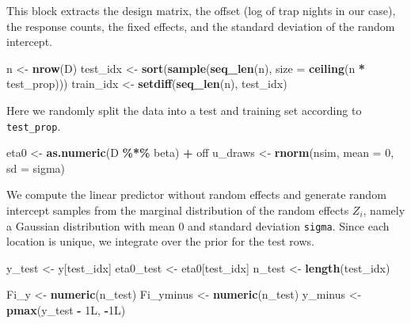 \documentclass[
  letterpaper,
]{krantz}
\newenvironment{Shaded}{\begin{snugshade}}{\end{snugshade}}
\newcommand{\AttributeTok}[1]{\textcolor[rgb]{0.13,0.29,0.53}{#1}}
\newcommand{\DecValTok}[1]{\textcolor[rgb]{0.00,0.00,0.81}{#1}}
\newcommand{\FunctionTok}[1]{\textcolor[rgb]{0.13,0.29,0.53}{\textbf{#1}}}
\newcommand{\NormalTok}[1]{#1}
\newcommand{\OtherTok}[1]{\textcolor[rgb]{0.56,0.35,0.01}{#1}}
\newcommand{\SpecialCharTok}[1]{\textcolor[rgb]{0.81,0.36,0.00}{\textbf{#1}}}
\begin{document}
This block extracts the design matrix, the offset (log of trap nights in
our case), the response counts, the fixed effects, and the standard
deviation of the random intercept.

\begin{Shaded}
\begin{Highlighting}[]
\NormalTok{  n }\OtherTok{\textless{}{-}} \FunctionTok{nrow}\NormalTok{(D)}
\NormalTok{  test\_idx  }\OtherTok{\textless{}{-}} \FunctionTok{sort}\NormalTok{(}\FunctionTok{sample}\NormalTok{(}\FunctionTok{seq\_len}\NormalTok{(n), }\AttributeTok{size =} \FunctionTok{ceiling}\NormalTok{(n }\SpecialCharTok{*}\NormalTok{ test\_prop)))}
\NormalTok{  train\_idx }\OtherTok{\textless{}{-}} \FunctionTok{setdiff}\NormalTok{(}\FunctionTok{seq\_len}\NormalTok{(n), test\_idx)}
\end{Highlighting}
\end{Shaded}

Here we randomly split the data into a test and training set according
to \texttt{test\_prop}.

\begin{Shaded}
\begin{Highlighting}[]
\NormalTok{  eta0 }\OtherTok{\textless{}{-}} \FunctionTok{as.numeric}\NormalTok{(D }\SpecialCharTok{\%*\%}\NormalTok{ beta) }\SpecialCharTok{+}\NormalTok{ off}
\NormalTok{  u\_draws }\OtherTok{\textless{}{-}} \FunctionTok{rnorm}\NormalTok{(nsim, }\AttributeTok{mean =} \DecValTok{0}\NormalTok{, }\AttributeTok{sd =}\NormalTok{ sigma)}
\end{Highlighting}
\end{Shaded}

We compute the linear predictor without random effects and generate
random intercept samples from the marginal distribution of the random
effects \(Z_i\), namely a Gaussian distribution with mean 0 and standard
deviation \texttt{sigma}. Since each location is unique, we integrate
over the prior for the test rows.

\begin{Shaded}
\begin{Highlighting}[]
\NormalTok{  y\_test    }\OtherTok{\textless{}{-}}\NormalTok{ y[test\_idx]}
\NormalTok{  eta0\_test }\OtherTok{\textless{}{-}}\NormalTok{ eta0[test\_idx]}
\NormalTok{  n\_test    }\OtherTok{\textless{}{-}} \FunctionTok{length}\NormalTok{(test\_idx)}

\NormalTok{  Fi\_y      }\OtherTok{\textless{}{-}} \FunctionTok{numeric}\NormalTok{(n\_test)}
\NormalTok{  Fi\_yminus }\OtherTok{\textless{}{-}} \FunctionTok{numeric}\NormalTok{(n\_test)}
\NormalTok{  y\_minus   }\OtherTok{\textless{}{-}} \FunctionTok{pmax}\NormalTok{(y\_test }\SpecialCharTok{{-}} \DecValTok{1}\NormalTok{L, }\SpecialCharTok{{-}}\DecValTok{1}\NormalTok{L)}
\end{Highlighting}
\end{Shaded}
\end{document}
